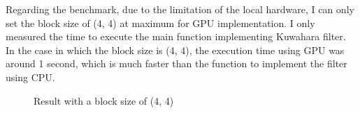 \documentclass{article}
\begin{document}
Regarding the benchmark, due to the limitation of the local hardware, I can only set the block size of (4, 4) at maximum for GPU implementation. I only measured the time to execute the main function implementing Kuwahara filter. In the case in which the block size is (4, 4), the execution time using GPU was around 1 second, which is much faster than the function to implement the filter using CPU. 

\begin{figure}[H]
    \caption{Result with a block size of (4, 4)}
\end{figure}
\end{document}
